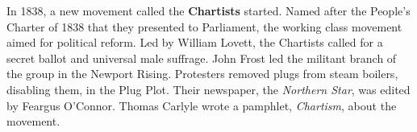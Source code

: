 In 1838, a new movement called the \textbf{Chartists} started.
Named after the People's Charter of 1838 that they presented to Parliament,
the working class movement aimed for political reform.
Led by William Lovett, the Chartists called for a secret ballot and universal male suffrage.
John Frost led the militant branch of the group in the Newport Rising.
Protesters removed plugs from steam boilers, disabling them, in the Plug Plot.
Their newspaper, the \textit{Northern Star}, was edited by Feargus O'Connor.
Thomas Carlyle wrote a pamphlet, \textit{Chartism}, about the movement.
